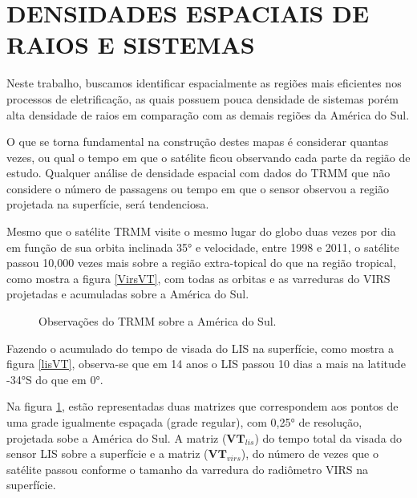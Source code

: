 \section{DENSIDADES ESPACIAIS DE RAIOS E SISTEMAS}
\label{metodoPass}

Neste trabalho, buscamos identificar espacialmente as regiões mais eficientes nos processos de eletrificação, as quais possuem pouca densidade de sistemas porém alta densidade de raios em comparação com as demais regiões da América do Sul.

O que se torna fundamental na construção destes mapas é considerar quantas vezes, ou qual o tempo em que o satélite ficou observando cada parte da região de estudo. Qualquer análise de densidade espacial com dados do TRMM que não considere o número de passagens ou tempo em que o sensor observou a região projetada na superfície, será tendenciosa.

Mesmo que o satélite TRMM visite o mesmo lugar do globo duas vezes por dia em função de sua orbita inclinada 35° e velocidade, entre 1998 e 2011, o satélite passou 10,000 vezes mais sobre a região extra-topical do que na região tropical, como mostra a figura \ref{VirsVT}, com todas as orbitas e as varreduras do VIRS projetadas e acumuladas sobre a América do Sul. 

\begin{figure}[!ht]

\caption{Observações do TRMM sobre a América do Sul.}
\label{gridVT} 
\end{figure} 

Fazendo o acumulado do tempo de visada do LIS na superfície, como mostra a figura \ref{lisVT}, observa-se que em 14 anos o LIS passou 10 dias a mais na latitude -34°S do que em 0°.

Na figura \ref{gridVT}, estão representadas duas matrizes que correspondem aos pontos de uma grade igualmente espaçada (grade regular), com 0,25° de resolução, projetada sobe a América do Sul. A matriz ($\mathbf{VT}_{lis}$) do tempo total da visada do sensor LIS sobre a superfície e a matriz ($\mathbf{VT}_{virs}$), do número de vezes que o satélite passou conforme o tamanho da varredura do radiômetro VIRS na superfície.  

